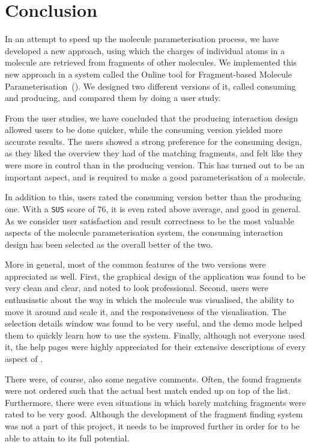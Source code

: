 \chapter{Conclusion}

In an attempt to speed up the molecule parameterisation process, we have developed a new approach, using which the charges of individual atoms in a molecule are retrieved from fragments of other molecules. We implemented this new approach in a system called the Online tool for Fragment-based Molecule Parameterisation~(\oframp). We designed two different versions of it, called consuming and producing, and compared them by doing a user study.

From the user studies, we have concluded that the producing interaction design allowed users to be done quicker, while the consuming version yielded more accurate results. The users showed a strong preference for the consuming design, as they liked the overview they had of the matching fragments, and felt like they were more in control than in the producing version. This has turned out to be an important aspect, and is required to make a good parameterisation of a molecule.

In addition to this, users rated the consuming version better than the producing one. With a \verb|SUS| score of 76, it is even rated above average, and good in general. As we consider user satisfaction and result correctness to be the most valuable aspects of the molecule parameterisation system, the consuming interaction design has been selected as the overall better of the two.

More in general, most of the common features of the two versions were appreciated as well. First, the graphical design of the application was found to be very clean and clear, and noted to look professional. Second, users were enthusiastic about the way in which the molecule was visualised, the ability to move it around and scale it, and the responsiveness of the visualisation. The selection details window was found to be very useful, and the demo mode helped them to quickly learn how to use the system. Finally, although not everyone used it, the help pages were highly appreciated for their extensive descriptions of every aspect of \oframp.

There were, of course, also some negative comments. Often, the found fragments were not ordered such that the actual best match ended up on top of the list. Furthermore, there were even situations in which barely matching fragments were rated to be very good. Although the development of the fragment finding system was not a part of this project, it needs to be improved further in order for \oframp{} to be able to attain to its full potential.

